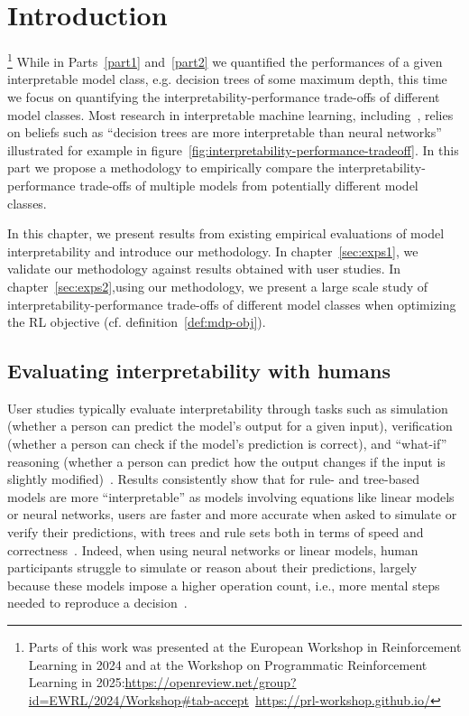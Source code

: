 \chapter{Introduction}\label{sec:intro-methodo}\footnote{Parts of this work was presented at the European Workshop in Reinforcement Learning in 2024 and at the Workshop on Programmatic Reinforcement Learning in 2025:\url{https://openreview.net/group?id=EWRL/2024/Workshop#tab-accept}~\url{https://prl-workshop.github.io/}}
While in Parts~\ref{part1} and~\ref{part2} we quantified the performances of a given interpretable model class, e.g. decision trees of some maximum depth, this time we focus on quantifying the interpretability-performance trade-offs of different model classes.
Most research in interpretable machine learning, including~\cite{topin2021iterative}, relies on beliefs such as ``decision trees are more interpretable than neural networks'' illustrated for example in figure~\ref{fig:interpretability-performance-tradeoff}.
In this part we propose a methodology to empirically compare the interpretability-performance trade-offs of multiple models from potentially different model classes.

In this chapter, we present results from existing empirical evaluations of model interpretability and introduce our methodology.
In chapter~\ref{sec:exps1}, we validate our methodology against results obtained with user studies.
In chapter~\ref{sec:exps2},using our methodology, we present a large scale study of interpretability-performance trade-offs of different model classes when optimizing the RL objective (cf. definition~\ref{def:mdp-obj}).

\section{Evaluating interpretability with humans}\label{sec:humans}
User studies typically evaluate interpretability through tasks such as simulation (whether a person can predict the model’s output for a given input), verification (whether a person can check if the model’s prediction is correct), and “what-if” reasoning (whether a person can predict how the output changes if the input is slightly modified)~\cite{study-6,study-5}.
Results consistently show that for rule- and tree-based models are more ``interpretable'' as models involving equations like linear models or neural networks, users are faster and more accurate when asked to simulate or verify their predictions, with trees and rule sets both in terms of speed and correctness~\cite{study-0,study-1,study-2,study-3,study-7}.
Indeed, when using neural networks or linear models, human participants struggle to simulate or reason about their predictions, largely because these models impose a higher operation count, i.e., more mental steps needed to reproduce a decision~\cite{study-5}.

